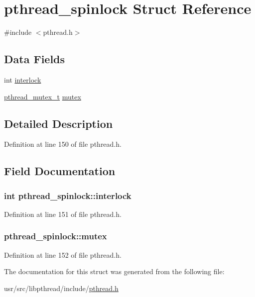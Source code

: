 \hypertarget{structpthread__spinlock}{\section{pthread\+\_\+spinlock Struct Reference}
\label{structpthread__spinlock}
}


{\ttfamily \#include $<$pthread.\+h$>$}

\subsection*{Data Fields}
\begin{DoxyCompactItemize}
\item 
int \hyperlink{structpthread__spinlock_a7b8aa3d5e657c6e399aa7a94c8c6d4fe}{interlock}
\item 
\hyperlink{pthread_8h_ad613e9ad2d8d9713a8440618e7a70bba}{pthread\+\_\+mutex\+\_\+t} \hyperlink{structpthread__spinlock_aebd79085a40b0d251d747a24f77746f5}{mutex}
\end{DoxyCompactItemize}


\subsection{Detailed Description}


Definition at line 150 of file pthread.\+h.



\subsection{Field Documentation}
\hypertarget{structpthread__spinlock_a7b8aa3d5e657c6e399aa7a94c8c6d4fe}{
\subsubsection[{interlock}]{\setlength{\rightskip}{0pt plus 5cm}int pthread\+\_\+spinlock\+::interlock}}\label{structpthread__spinlock_a7b8aa3d5e657c6e399aa7a94c8c6d4fe}


Definition at line 151 of file pthread.\+h.

\hypertarget{structpthread__spinlock_aebd79085a40b0d251d747a24f77746f5}{
\subsubsection[{mutex}]{ pthread\+\_\+spinlock\+::mutex}}\label{structpthread__spinlock_aebd79085a40b0d251d747a24f77746f5}


Definition at line 152 of file pthread.\+h.



The documentation for this struct was generated from the following file\+:\begin{DoxyCompactItemize}
\item 
usr/src/libpthread/include/\hyperlink{pthread_8h}{pthread.\+h}\end{DoxyCompactItemize}
